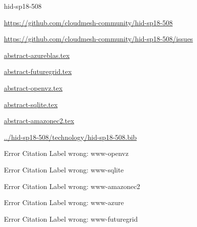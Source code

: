 \begin{IU}

hid-sp18-508

\url{https://github.com/cloudmesh-community/hid-sp18-508}

\url{https://github.com/cloudmesh-community/hid-sp18-508/issues}

\href{https://github.com/cloudmesh-community/hid-sp18-508/blob/master//technology/abstract-azureblas.tex}{abstract-azureblas.tex}

\href{https://github.com/cloudmesh-community/hid-sp18-508/blob/master//technology/abstract-futuregrid.tex}{abstract-futuregrid.tex}

\href{https://github.com/cloudmesh-community/hid-sp18-508/blob/master//technology/abstract-openvz.tex}{abstract-openvz.tex}

\href{https://github.com/cloudmesh-community/hid-sp18-508/blob/master//technology/abstract-sqlite.tex}{abstract-sqlite.tex}

\href{https://github.com/cloudmesh-community/hid-sp18-508/blob/master//technology/abstract-amazonec2.tex}{abstract-amazonec2.tex}

\href{https://github.com/cloudmesh-community/hid-sp18-508/blob/master//technology/hid-sp18-508.bib}{../hid-sp18-508/technology/hid-sp18-508.bib}

 Error Citation Label wrong: www-openvz

 Error Citation Label wrong: www-sqlite

 Error Citation Label wrong: www-amazonec2

 Error Citation Label wrong: www-azure

 Error Citation Label wrong: www-futuregrid

\end{IU}


